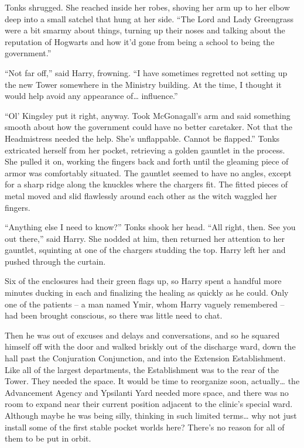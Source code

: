 Tonks shrugged. She reached inside her robes, shoving her arm up to her
elbow deep into a small satchel that hung at her side. ``The Lord and
Lady Greengrass were a bit smarmy about things, turning up their noses
and talking about the reputation of Hogwarts and how it'd gone from
being a school to being the government.''

``Not far off,'' said Harry, frowning. ``I have sometimes regretted not
setting up the new Tower somewhere in the Ministry building. At the
time, I thought it would help avoid any appearance of\ldots{}
influence.''

``Ol' Kingsley put it right, anyway. Took McGonagall's arm and said
something smooth about how the government could have no better
caretaker. Not that the Headmistress needed the help. She's unflappable.
Cannot be flapped.'' Tonks extricated herself from her pocket,
retrieving a golden gauntlet in the process. She pulled it on, working
the fingers back and forth until the gleaming piece of armor was
comfortably situated. The gauntlet seemed to have no angles, except for
a sharp ridge along the knuckles where the chargers fit. The fitted
pieces of metal moved and slid flawlessly around each other as the witch
waggled her fingers.

``Anything else I need to know?'' Tonks shook her head. ``All right,
then. See you out there,'' said Harry. She nodded at him, then returned
her attention to her gauntlet, squinting at one of the chargers studding
the top. Harry left her and pushed through the curtain.

Six of the enclosures had their green flags up, so Harry spent a handful
more minutes ducking in each and finalizing the healing as quickly as he
could. Only one of the patients -- a man named Ymir, whom Harry vaguely
remembered -- had been brought conscious, so there was little need to
chat.

Then he was out of excuses and delays and conversations, and so he
squared himself off with the door and walked briskly out of the
discharge ward, down the hall past the Conjuration Conjunction, and into
the Extension Establishment. Like all of the largest departments, the
Establishment was to the rear of the Tower. They needed the space. It
would be time to reorganize soon, actually\ldots{} the Advancement
Agency and Ypsilanti Yard needed more space, and there was no room to
expand near their current position adjacent to the clinic's special
ward. Although maybe he was being silly, thinking in such limited
terms\ldots{} why not just install some of the first stable pocket
worlds here? There's no reason for all of them to be put in orbit.

